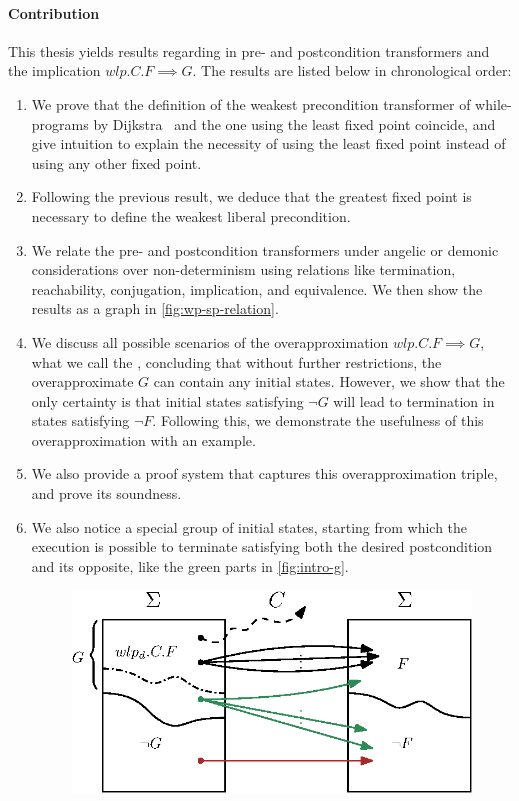 \paragraph{Contribution}
This thesis yields results regarding in pre- and postcondition transformers and the implication $wlp.C.F\implies G$. 
The results are listed below in chronological order: 
\begin{enumerate}
    \item We prove that the definition of the weakest precondition transformer of while-programs by Dijkstra~\cite{dijkstra75} and the one using the least fixed point coincide, and give intuition to explain the necessity of using the least fixed point instead of using any other fixed point. 
    \item Following the previous result, we deduce that the greatest fixed point is necessary to define the weakest liberal precondition. 
    \item We relate the pre- and postcondition transformers under angelic or demonic considerations over non-determinism using relations like termination, reachability, conjugation, implication, and equivalence. 
    We then show the results as a graph in \autoref{fig:wp-sp-relation}.
    \item We discuss all possible scenarios of the overapproximation $wlp.C.F\implies G$, what we call the , concluding that without further restrictions, the overapproximate $G$ can contain any initial states. However, we show that the only certainty is that initial states satisfying $\neg G$ will lead to termination in states satisfying $\neg F$. Following this, we demonstrate the usefulness of this overapproximation with an example. 
    \item We also provide a proof system that captures this overapproximation triple, and prove its soundness. 
    \item We also notice a special group of initial states, starting from which the execution is possible to terminate satisfying both the desired postcondition and its opposite, like the green parts in \autoref{fig:intro-g}. 
    \begin{figure}[t]
        \centering
        \includegraphics[width=.6\linewidth]{image/wlp-g/wlp-g-gg.eps}

\end{figure}
\end{enumerate}

